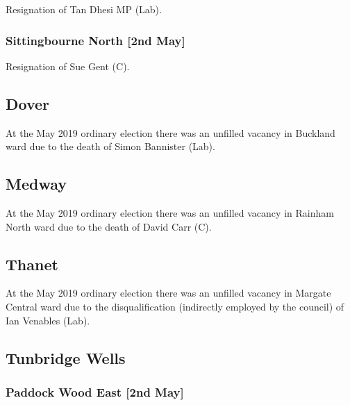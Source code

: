 \documentclass[a4paper,openany]{book}
\begin{document}
\begin{resultsiii}

Resignation of Tan Dhesi MP (Lab).

\subsubsection*{Sittingbourne North \hspace*{\fill}\nolinebreak[1]%
	\enspace\hspace*{\fill}
	[2nd May]}


Resignation of Sue Gent (C).

\subsection*{Dover}

At the May 2019 ordinary election there was an unfilled vacancy in Buckland ward due to the death of Simon Bannister (Lab).

\subsection*{Medway}

At the May 2019 ordinary election there was an unfilled vacancy in Rainham North ward due to the death of David Carr (C).

\subsection*{Thanet}

At the May 2019 ordinary election there was an unfilled vacancy in Margate Central ward due to the disqualification (indirectly employed by the council) of Ian Venables (Lab).

\subsection*{Tunbridge Wells}

\subsubsection*{Paddock Wood East \hspace*{\fill}\nolinebreak[1]%
	\enspace\hspace*{\fill}
	[2nd May]}


\end{resultsiii}
\end{document}
